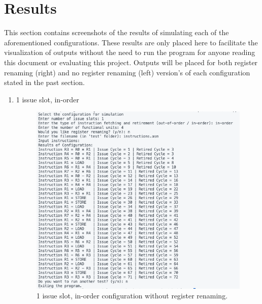 \documentclass{article}
\begin{document}
\section{Results}
This section contains screenshots of the results of simulating each of the aforementioned configurations. These results are only placed here to facilitate the visualization of outputs without the need to run the program for anyone reading this document or evaluating this project. Outputs will be placed for both register renaming (right) and no register renaming (left) version's of each configuration stated in the past section. 
\begin{enumerate}
    \item 1 issue slot, in-order 
    \begin{figure}[H]
        \centering 
        \begin{minipage}[t]{0.45\textwidth}
            \centering
            \includegraphics[width=\textwidth]{Images/Config1.png}
            \caption{1 issue slot, in-order configuration without register renaming.}
        \end{minipage}
        \hfill
        \begin{minipage}[t]{0.45\textwidth}
            \centering 

\end{minipage}
\end{figure}
\end{enumerate}
\end{document}
